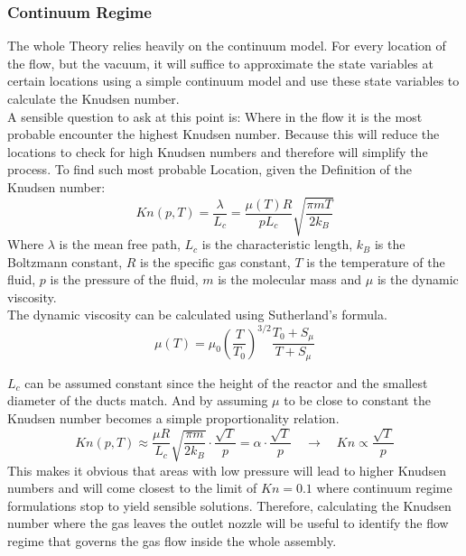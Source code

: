 \subsubsection*{Continuum Regime}
	The whole Theory relies heavily on the continuum model.
	For every location of the flow, but the vacuum, it will suffice to approximate the state variables at certain locations using a simple continuum model and use these state variables to calculate the Knudsen number.\\
	A sensible question to ask at this point is: Where in the flow it is the most probable encounter the highest Knudsen number.
	Because this will reduce the locations to check for high Knudsen numbers and therefore will simplify the process.
	To find such most probable Location, given the Definition of the Knudsen number:
	$$
		Kn(p,T) = \frac{\lambda}{L_c} = \frac{\mu(T)R}{pL_c}\sqrt{\frac{\pi m T}{2k_B}}
	$$
	Where $\lambda$ is the mean free path, $L_c$ is the characteristic length, $k_B$ is the Boltzmann constant, $R$ is the specific gas constant, $T$ is the temperature of the fluid, $p$ is the pressure of the fluid, $m$ is the molecular mass and $\mu$ is the dynamic viscosity.\\
	The dynamic viscosity can be calculated using Sutherland's formula.
	$$
		\mu(T) = \mu_0 \left(\frac{T}{T_0}\right)^{3/2} \frac{T_0 + S_\mu}{T + S_\mu}
	$$
	
	$L_c$ can be assumed constant since the height of the reactor and the smallest diameter of the ducts match.
	And by assuming $\mu$ to be close to constant the Knudsen number becomes a simple proportionality relation.
	$$
		Kn(p,T)\approx\frac{\mu R}{L_c}\sqrt{\frac{\pi m}{2k_B}}\cdot\frac{\sqrt{T}}{p}=\alpha\cdot\frac{\sqrt{T}}{p}\quad\rightarrow\quad Kn\propto \frac{\sqrt{T}}{p}
	$$
	This makes it obvious that areas with low pressure will lead to higher Knudsen numbers and will come closest to the limit of $Kn=0.1$ where continuum regime formulations stop to yield sensible solutions.
	Therefore, calculating the Knudsen number where the gas leaves the outlet nozzle will be useful to identify the flow regime that governs the gas flow inside the whole assembly.


